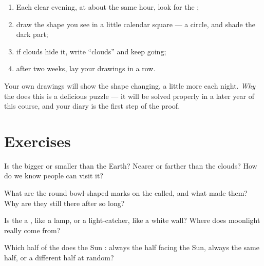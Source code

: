 \begin{method}\label{met:g2:moon-in-the-sky:diary}
\begin{enumerate}
  \item Each clear evening, at about the same hour, look for the
        ;
  \item draw the shape you see in a little calendar square --- a
        circle, and shade the dark part;
  \item if clouds hide it, write ``clouds'' and keep going;
  \item after two weeks, lay your drawings in a row.
\end{enumerate}
Your own drawings will show the shape changing, a little more each
night. \emph{Why} the  does this is
a delicious puzzle --- it will be solved properly in a later year of
this course, and your diary is the first step of the proof.
\end{method}

\section{Exercises}

\begin{exercise}[$\star$]\label{exo:g2:moon-in-the-sky:1}
Is the  bigger or smaller than the Earth? Nearer or farther than
the clouds? How do we know people can visit it?
\end{exercise}

\begin{exercise}[$\star$]\label{exo:g2:moon-in-the-sky:2}
What are the round bowl-shaped marks on the  called, and what
made them? Why are they still there after so long?
\end{exercise}

\begin{exercise}[$\star$]\label{exo:g2:moon-in-the-sky:3}
Is the  a , like a lamp, or a light-catcher, like a
white wall? Where does moonlight really come from?
\end{exercise}

\begin{exercise}[$\star$]\label{exo:g2:moon-in-the-sky:4}
Which half of the  does the Sun : always the half facing
the Sun, always the same half, or a different half at random?
\end{exercise}


